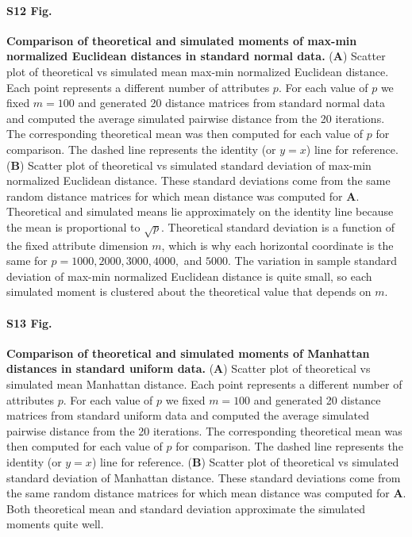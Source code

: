 \documentclass[10pt,letterpaper]{article}
\begin{document}
\paragraph*{S12 Fig.}
\hypertarget{S12_Fig}{
{\bf Comparison of theoretical and simulated moments of max-min normalized Euclidean distances in standard normal data.} (\textbf{A}) Scatter plot of theoretical vs simulated mean max-min normalized Euclidean distance. Each point represents a different number of attributes $p$. For each value of $p$ we fixed $m=100$ and generated 20 distance matrices from standard normal data and computed the average simulated pairwise distance from the 20 iterations. The corresponding theoretical mean was then computed for each value of $p$ for comparison. The dashed line represents the identity (or $y=x$) line for reference. (\textbf{B}) Scatter plot of theoretical vs simulated standard deviation of max-min normalized Euclidean distance. These standard deviations come from the same random distance matrices for which mean distance was computed for \textbf{A}. Theoretical and simulated means lie approximately on the identity line because the mean is proportional to $\sqrt{p}$. Theoretical standard deviation is a function of the fixed attribute dimension $m$, which is why each horizontal coordinate is the same for $p=1000,2000,3000,4000,$ and $5000$. The variation in sample standard deviation of max-min normalized Euclidean distance is quite small, so each simulated moment is clustered about the theoretical value that depends on $m$.}

\paragraph*{S13 Fig.}
\hypertarget{S13_Fig}{
{\bf Comparison of theoretical and simulated moments of Manhattan distances in standard uniform data.} (\textbf{A}) Scatter plot of theoretical vs simulated mean Manhattan distance. Each point represents a different number of attributes $p$. For each value of $p$ we fixed $m=100$ and generated 20 distance matrices from standard uniform data and computed the average simulated pairwise distance from the 20 iterations. The corresponding theoretical mean was then computed for each value of $p$ for comparison. The dashed line represents the identity (or $y=x$) line for reference. (\textbf{B}) Scatter plot of theoretical vs simulated standard deviation of Manhattan distance. These standard deviations come from the same random distance matrices for which mean distance was computed for \textbf{A}. Both theoretical mean and standard deviation approximate the simulated moments quite well.}
\end{document}
